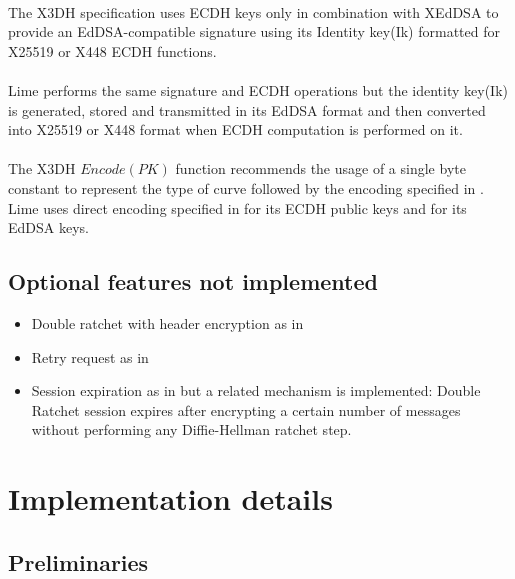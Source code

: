 \documentclass[a4paper,11pt]{article}
\begin{document}
    \paragraph{}The X3DH specification uses ECDH keys only in combination with XEdDSA\cite{xeddsa} to provide an EdDSA-compatible signature using its Identity key(Ik) formatted for X25519 or X448 ECDH functions.
    \paragraph{}Lime performs the same signature and ECDH operations but the identity key(Ik) is generated, stored and transmitted in its EdDSA format and then converted into X25519 or X448 format when ECDH computation is performed on it.
    \paragraph{}The X3DH $Encode(PK)$ function recommends the usage of a single byte constant to represent the type of curve followed by the encoding specified in \cite{rfc7748}. Lime uses direct encoding specified in \cite{rfc7748} for its ECDH public keys and \cite{rfc8032} for its EdDSA keys.

  \subsection{Optional features not implemented}
    \begin{itemize}
      \item Double ratchet with header encryption as in \cite[section 4]{doubleRatchet}
      \item Retry request as in \cite[section 4.1]{sesame}
      \item Session expiration as in \cite[section 4.2]{sesame} but a related mechanism is implemented: Double Ratchet session expires after encrypting a certain number of messages without performing any Diffie-Hellman ratchet step.
    \end{itemize}

\section{Implementation details}
  \subsection{Preliminaries}
\end{document}
